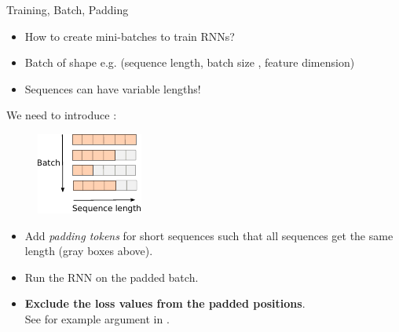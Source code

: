 \begin{frame}[fragile]{Training, Batch, Padding}
\vspace{-5mm}
\begin{itemize}
\item How to create mini-batches to train RNNs?
\item Batch of shape e.g. (sequence length, batch size , feature dimension)
\item Sequences can have variable lengths!
\end{itemize}
\vsp
We need to introduce :
\begin{figure}
                        \centering
                        \includegraphics[width=.3\linewidth]{./figures/padding.pdf}
\end{figure}

\begin{itemize}
\item Add \textit{padding tokens} for short sequences such that all sequences get the same length (gray boxes above).
\item Run the RNN on the padded batch.
\item \textbf{Exclude the loss values from the padded positions}.\\
See for example  argument in .
\end{itemize}
\end{frame}

